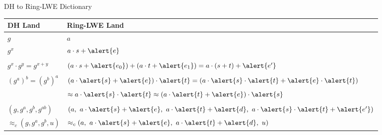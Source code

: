 \documentclass[xcolor=table,10pt,aspectratio=169]{beamer}
\begin{document}
\begin{frame}[label={sec:org4555df7}]{DH to Ring-LWE Dictionary}
\begin{center}
\begin{tabular}{ll}
\toprule
DH Land & Ring-LWE Land\\
\midrule
\(g\) & \(a\)\\
\(g^x\) & \(a\cdot {s} + \alert{e}\)\\
 & \\
\(g^x \cdot g^y = g^{x+y}\) & \((a\cdot {s} + \alert{e_0}) + (a \cdot {t} + \alert{e_1}) = a \cdot {(s+t)} + \alert{e'}\)\\
 & \\
\((g^a)^b = (g^b)^a\) & \((a\cdot \alert{s} + \alert{e})\cdot \alert{t} = (a\cdot \alert{s} \cdot \alert{t} + \alert{e} \cdot \alert{t})\)\\
 & \(\approx a\cdot \alert{s} \cdot \alert{t} \approx (a\cdot \alert{t} + \alert{e})\cdot \alert{s}\)\\
 & \\
\((g, g^a, g^b, g^{ab})\) & \((a,\ a\cdot \alert{s} + \alert{e},\ a\cdot \alert{t} + \alert{d},\ a \cdot \alert{s} \cdot \alert{t} + \alert{e'})\)\\
\(\approx_c (g, g^a, g^b, u)\) & \(\approx_c (a,\ a\cdot \alert{s} + \alert{e},\ a\cdot \alert{t} + \alert{d},\ u)\)\\
\bottomrule
\end{tabular}

\end{center}
\end{frame}
\end{document}
